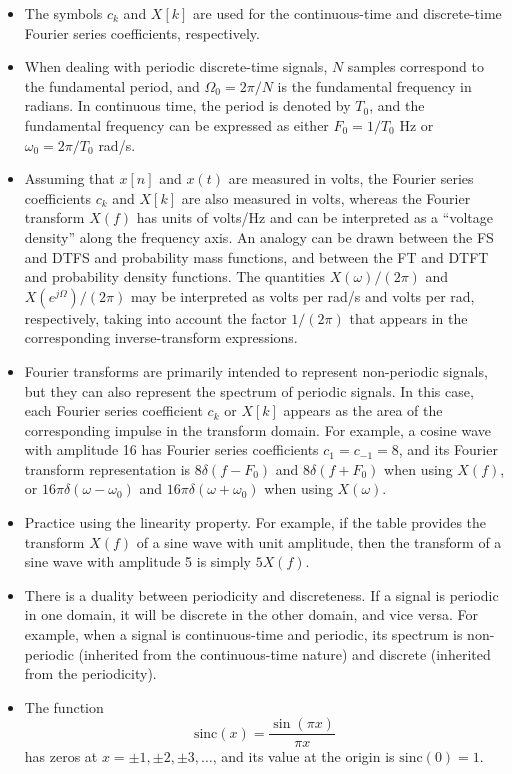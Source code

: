 \documentclass{article}
\newcommand{\dw}{\Omega} %
\newcommand{\aw}{\omega} %
\begin{document}
\begin{itemize}
\item The symbols $c_k$ and $X[k]$ are used for the continuous-time and discrete-time Fourier series coefficients, respectively.

\item When dealing with periodic discrete-time signals, $N$ samples correspond to the fundamental period, and $\dw_0 = 2\pi/N$ is the fundamental frequency in radians. In continuous time, the period is denoted by $T_0$, and the fundamental frequency can be expressed as either $F_0 = 1/T_0$ Hz or $\aw_0 = 2\pi/T_0$ rad/s.

\item Assuming that $x[n]$ and $x(t)$ are measured in volts, the Fourier series coefficients $c_k$ and $X[k]$ are also measured in volts, whereas the Fourier transform $X(f)$ has units of volts/Hz and can be interpreted as a ``voltage density'' along the frequency axis. An analogy can be drawn between the FS and DTFS and probability mass functions, and between the FT and DTFT and probability density functions. The quantities $X(\aw)/(2\pi)$ and $X(e^{j\dw})/(2\pi)$ may be interpreted as volts per rad/s and volts per rad, respectively, taking into account the factor $1/(2\pi)$ that appears in the corresponding inverse-transform expressions.

\item Fourier transforms are primarily intended to represent non-periodic signals, but they can also represent the spectrum of periodic signals. In this case, each Fourier series coefficient $c_k$ or $X[k]$ appears as the area of the corresponding impulse in the transform domain. For example, a cosine wave with amplitude 16 has Fourier series coefficients $c_1 = c_{-1} = 8$, and its Fourier transform representation is $8\delta(f-F_0)$ and $8\delta(f+F_0)$ when using $X(f)$, or $16\pi\delta(\aw-\aw_0)$ and $16\pi\delta(\aw+\aw_0)$ when using $X(\aw)$.

\item Practice using the linearity property. For example, if the table provides the transform $X(f)$ of a sine wave with unit amplitude, then the transform of a sine wave with amplitude 5 is simply $5X(f)$.

\item There is a duality between periodicity and discreteness. If a signal is periodic in one domain, it will be discrete in the other domain, and vice versa. For example, when a signal is continuous-time and periodic, its spectrum is non-periodic (inherited from the continuous-time nature) and discrete (inherited from the periodicity).

\item The function
\[
\textrm{sinc}(x)=\frac{\sin(\pi x)}{\pi x}
\]
has zeros at $x=\pm 1,\pm 2,\pm 3,\ldots$, and its value at the origin is $\textrm{sinc}(0)=1$.

\end{itemize}
\end{document}

